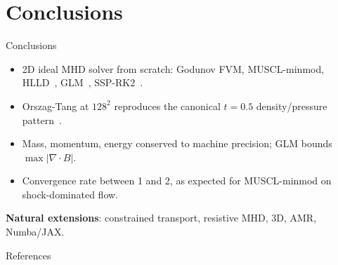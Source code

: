 \documentclass[aspectratio=43]{beamer}
\begin{document}
\section{Conclusions}

\begin{frame}{Conclusions}
  \begin{itemize}
    \item 2D ideal MHD solver from scratch: Godunov FVM, MUSCL-minmod, HLLD~\cite{miyoshi2005}, GLM~\cite{dedner2002}, SSP-RK2~\cite{shu1988}.
    \item Orszag-Tang at $128^{2}$ reproduces the canonical $t = 0.5$ density/pressure pattern~\cite{londrillo2000,athena_orszag_tang}.
    \item Mass, momentum, energy conserved to machine precision; GLM bounds $\max|\nabla\cdot B|$.
    \item Convergence rate between 1 and 2, as expected for MUSCL-minmod on shock-dominated flow.
  \end{itemize}
  \vspace{0.5em}
  \textbf{Natural extensions}: constrained transport, resistive MHD, 3D, AMR, Numba/JAX.
\end{frame}

\begin{frame}[allowframebreaks]{References}
  \scriptsize
  \printbibliography[heading=none]
\end{frame}
\end{document}
